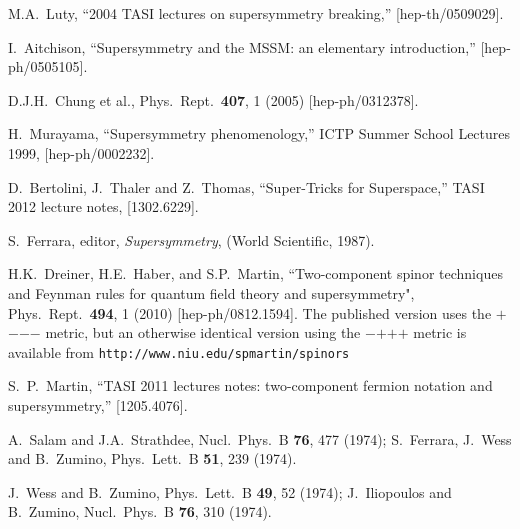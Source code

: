 \documentclass[12pt]{article}
\begin{document}
\begin{thebibliography}{999}
M.A.~Luty,
  ``2004 TASI lectures on supersymmetry breaking,''
  [hep-th/0509029].

I.~Aitchison,%
  ``Supersymmetry and the MSSM: an elementary introduction,''
  [hep-ph/0505105].

D.J.H.~Chung et al., 
  Phys.\ Rept.\  {\bf 407}, 1 (2005)
  [hep-ph/0312378].

  H.~Murayama,
  ``Supersymmetry phenomenology,'' ICTP Summer School Lectures 1999,
  [hep-ph/0002232].

  D.~Bertolini, J.~Thaler and Z.~Thomas,
  ``Super-Tricks for Superspace,''
  TASI 2012 lecture notes, 
  [1302.6229].
  
S.~Ferrara, editor, {\em Supersymmetry},
(World Scientific, 1987).

 H.K.~Dreiner, H.E.~Haber, and S.P.~Martin,
  ``Two-component spinor techniques and Feynman rules for
  quantum field theory and supersymmetry",
  Phys.\ Rept.\  {\bf 494}, 1 (2010)
  [hep-ph/0812.1594]. The published version uses the $+$$-$$-$$-$ metric,
  but an otherwise identical version using the $-$$+$$+$$+$ metric is available from
  \verb$http://www.niu.edu/spmartin/spinors$ 

  S.~P.~Martin,
  ``TASI 2011 lectures notes: two-component fermion notation and supersymmetry,''
  [1205.4076].

A.~Salam and J.A.~Strathdee,
  Nucl.\ Phys.\ B {\bf 76}, 477 (1974);
S.~Ferrara, J.~Wess and B.~Zumino,
  Phys.\ Lett.\ B {\bf 51}, 239 (1974).

J.~Wess and B.~Zumino,
  Phys.\ Lett.\ B {\bf 49}, 52 (1974);
J.~Iliopoulos and B.~Zumino,
  Nucl.\ Phys.\ B {\bf 76}, 310 (1974).


\end{thebibliography}
\end{document}
